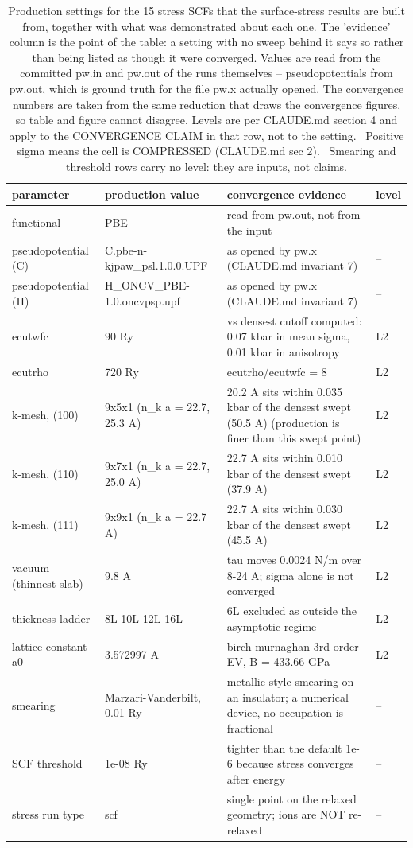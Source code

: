 \begin{table}[htbp]
  \centering
  \caption{Production settings for the 15 stress SCFs that the surface-stress results are built from, together with what was demonstrated about each one. The 'evidence' column is the point of the table: a setting with no sweep behind it says so rather than being listed as though it were converged. Values are read from the committed pw.in and pw.out of the runs themselves -- pseudopotentials from pw.out, which is ground truth for the file pw.x actually opened. The convergence numbers are taken from the same reduction that draws the convergence figures, so table and figure cannot disagree. Levels are per CLAUDE.md section 4 and apply to the CONVERGENCE CLAIM in that row, not to the setting. \textbullet\ Positive sigma means the cell is COMPRESSED (CLAUDE.md sec 2). \textbullet\ Smearing and threshold rows carry no level: they are inputs, not claims.}
  \label{tab:t1-production-settings}
  \begin{tabular}{llll}
    \toprule
    parameter & production value & convergence evidence & level \\
    \midrule
    functional & PBE & read from pw.out, not from the input & -- \\
    pseudopotential (C) & C.pbe-n-kjpaw\_psl.1.0.0.UPF & as opened by pw.x (CLAUDE.md invariant 7) & -- \\
    pseudopotential (H) & H\_ONCV\_PBE-1.0.oncvpsp.upf & as opened by pw.x (CLAUDE.md invariant 7) & -- \\
    ecutwfc & 90 Ry & vs densest cutoff computed: 0.07 kbar in mean sigma, 0.01 kbar in anisotropy & L2 \\
    ecutrho & 720 Ry & ecutrho/ecutwfc = 8 & L2 \\
    k-mesh, (100) & 9x5x1 (n\_k a = 22.7, 25.3 A) & 20.2 A sits within 0.035 kbar of the densest swept (50.5 A) (production is finer than this swept point) & L2 \\
    k-mesh, (110) & 9x7x1 (n\_k a = 22.7, 25.0 A) & 22.7 A sits within 0.010 kbar of the densest swept (37.9 A) & L2 \\
    k-mesh, (111) & 9x9x1 (n\_k a = 22.7 A) & 22.7 A sits within 0.030 kbar of the densest swept (45.5 A) & L2 \\
    vacuum (thinnest slab) & 9.8 A & tau moves 0.0024 N/m over 8-24 A; sigma alone is not converged & L2 \\
    thickness ladder & 8L 10L 12L 16L & 6L excluded as outside the asymptotic regime & L2 \\
    lattice constant a0 & 3.572997 A & birch murnaghan 3rd order EV, B = 433.66 GPa & L2 \\
    smearing & Marzari-Vanderbilt, 0.01 Ry & metallic-style smearing on an insulator; a numerical device, no occupation is fractional & -- \\
    SCF threshold & 1e-08 Ry & tighter than the default 1e-6 because stress converges after energy & -- \\
    stress run type & scf & single point on the relaxed geometry; ions are NOT re-relaxed & -- \\
    \bottomrule
  \end{tabular}
\end{table}
